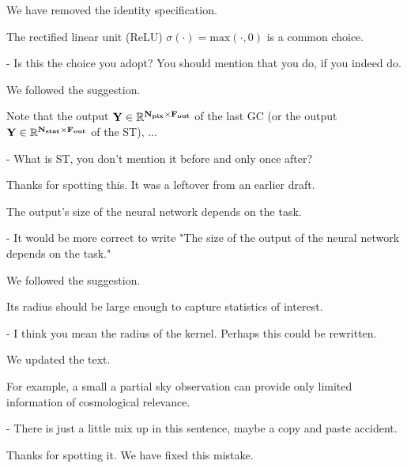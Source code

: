 \documentclass[12pt,a4paper]{article}
\newcommand{\nati}[1]{{\color[rgb]{.1,.6,.1}{NP: #1}}}
\newcommand{\mdeff}[1]{{\color[rgb]{.1,.6,.1}{MD: #1}}}
\newcommand{\todo}[1]{{\color[rgb]{.6,.1,.6}{TODO: #1}}}
\newcommand{\1}{\b{1}}              %
\newcommand{\0}{\b{0}}              %
\begin{document}
We have removed the identity specification.

\begin{mdframed}[style=comment]
The rectified linear unit (ReLU) $\sigma(\cdot) = \textrm{max}(\cdot, 0)$ is a common choice.

- Is this the choice you adopt? You should mention that you do, if you indeed do.
\end{mdframed}

We followed the suggestion.

\begin{mdframed}[style=comment]
Note that the output $\bf{Y}\in\mathbb{R}^{N_{pix}\times F_{out}}$ of the last GC (or the output $\bf{Y}\in\mathbb{R}^{N_{stat}\times F_{out}}$ of the ST), ...

- What is ST, you don't mention it before and only once after?
\end{mdframed}

Thanks for spotting this.
It was a leftover from an earlier draft.

\begin{mdframed}[style=comment]
The output’s size of the neural network depends on the task.

- It would be more correct to write "The size of the output of the neural network depends on the task."
\end{mdframed}

We followed the suggestion.

\begin{mdframed}[style=comment]
Its radius should be large enough to capture statistics of interest.

- I think you mean the radius of the kernel. Perhaps this could be rewritten.
\end{mdframed}

We updated the text.

\begin{mdframed}[style=comment]
For example, a small a partial sky observation can provide only limited information of cosmological relevance.

- There is just a little mix up in this sentence, maybe a copy and paste accident.
\end{mdframed}

Thanks for spotting it. We have fixed this mistake.
\end{document}
